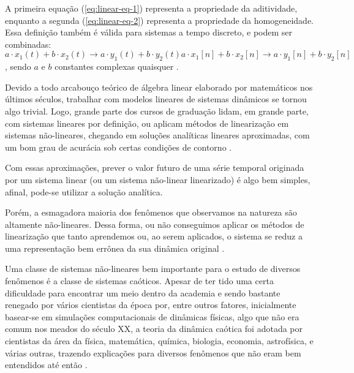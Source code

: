 \documentclass[a4paper, 12pt]{article}
\begin{document}
A primeira equação (\ref{eq:linear-eq-1}) representa a propriedade da aditividade, enquanto a segunda (\ref{eq:linear-eq-2}) representa a propriedade da homogeneidade. Essa definição também é válida para sistemas a tempo discreto, e podem ser combinadas:
\begin{subequations}
\begin{equation}
a \cdot x_1(t) + b \cdot x_2(t) \rightarrow a \cdot y_1(t) + b \cdot y_2(t)
\end{equation}
\begin{equation}
a \cdot x_1[n] + b \cdot x_2[n] \rightarrow a \cdot y_1[n] + b \cdot y_2[n]
\end{equation}
\end{subequations}
, sendo $a$ e $b$ constantes complexas quaisquer \cite{oppenheim2014signals}.

Devido a todo arcabouço teórico de álgebra linear elaborado por matemáticos nos últimos séculos, trabalhar com modelos lineares de sistemas dinâmicos se tornou algo trivial. Logo, grande parte dos cursos de graduação lidam, em grande parte, com sistemas lineares por definição, ou aplicam métodos de linearização em sistemas não-lineares, chegando em soluções analíticas lineares aproximadas, com um bom grau de acurácia sob certas condições de contorno \cite{fiedler1994caos}. 

Com essas aproximações, prever o valor futuro de uma série temporal originada por um sistema linear (ou um sistema não-linear linearizado) é algo bem simples, afinal, pode-se utilizar a solução analítica.

Porém, a esmagadora maioria dos fenômenos que observamos na natureza são altamente não-lineares. Dessa forma, ou não conseguimos aplicar os métodos de linearização que tanto aprendemos ou, ao serem aplicados, o sistema se reduz a uma representação bem errônea da sua dinâmica original \cite{gleick2008chaos}.

Uma classe de sistemas não-lineares bem importante para o estudo de diversos fenômenos é a classe de sistemas caóticos. Apesar de ter tido uma certa dificuldade para encontrar um meio dentro da academia e sendo bastante renegado por vários cientistas da época por, entre outros fatores, inicialmente basear-se em simulações  computacionais de dinâmicas físicas, algo que não era comum nos meados do século XX, a teoria da dinâmica caótica foi adotada por cientistas da área da física, matemática, química, biologia, economia, astrofísica, e várias outras, trazendo explicações para diversos fenômenos que não eram bem entendidos até então \cite{gleick2008chaos}. 
\end{document}
